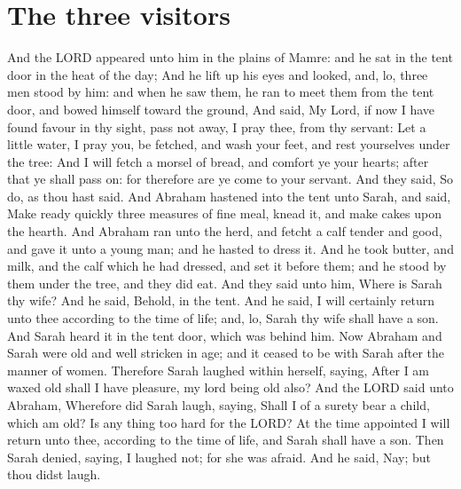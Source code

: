 \section*{The three visitors}
\begin{biblechapter} %
\verse And the LORD appeared unto him in the plains of Mamre: and he sat in the tent door in the heat of the day;
\verse And he lift up his eyes and looked, and, lo, three men stood by him: and when he saw them, he ran to meet them from the tent door, and bowed himself toward the ground,
\verse And said, My Lord, if now I have found favour in thy sight, pass not away, I pray thee, from thy servant:
\verse Let a little water, I pray you, be fetched, and wash your feet, and rest yourselves under the tree:
\verse And I will fetch a morsel of bread, and comfort ye your hearts; after that ye shall pass on: for therefore are ye come to your servant. And they said, So do, as thou hast said.
\verse And Abraham hastened into the tent unto Sarah, and said, Make ready quickly three measures of fine meal, knead it, and make cakes upon the hearth.
\verse And Abraham ran unto the herd, and fetcht a calf tender and good, and gave it unto a young man; and he hasted to dress it.
\verse And he took butter, and milk, and the calf which he had dressed, and set it before them; and he stood by them under the tree, and they did eat.
\verse And they said unto him, Where is Sarah thy wife? And he said, Behold, in the tent.
\verse And he said, I will certainly return unto thee according to the time of life; and, lo, Sarah thy wife shall have a son. And Sarah heard it in the tent door, which was behind him.
\verse Now Abraham and Sarah were old and well stricken in age; and it ceased to be with Sarah after the manner of women.
\verse Therefore Sarah laughed within herself, saying, After I am waxed old shall I have pleasure, my lord being old also?
\verse And the LORD said unto Abraham, Wherefore did Sarah laugh, saying, Shall I of a surety bear a child, which am old?
\verse Is any thing too hard for the LORD? At the time appointed I will return unto thee, according to the time of life, and Sarah shall have a son.
\verse Then Sarah denied, saying, I laughed not; for she was afraid. And he said, Nay; but thou didst laugh.

\end{biblechapter}

